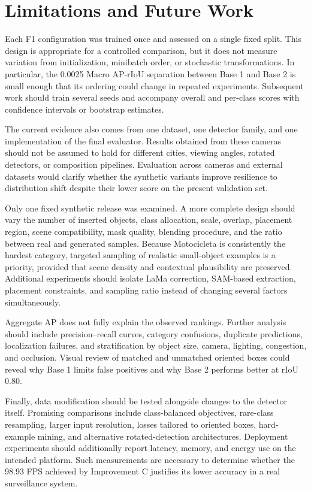 \section{Limitations and Future Work}
\label{sec:limitations_future_work}

Each F1 configuration was trained once and assessed on a single fixed split. This design is appropriate for a controlled comparison, but it does not measure variation from initialization, minibatch order, or stochastic transformations. In particular, the 0.0025 Macro AP-rIoU separation between Base 1 and Base 2 is small enough that its ordering could change in repeated experiments. Subsequent work should train several seeds and accompany overall and per-class scores with confidence intervals or bootstrap estimates.

The current evidence also comes from one dataset, one detector family, and one implementation of the final evaluator. Results obtained from these cameras should not be assumed to hold for different cities, viewing angles, rotated detectors, or composition pipelines. Evaluation across cameras and external datasets would clarify whether the synthetic variants improve resilience to distribution shift despite their lower score on the present validation set.

Only one fixed synthetic release was examined. A more complete design should vary the number of inserted objects, class allocation, scale, overlap, placement region, scene compatibility, mask quality, blending procedure, and the ratio between real and generated samples. Because Motocicleta is consistently the hardest category, targeted sampling of realistic small-object examples is a priority, provided that scene density and contextual plausibility are preserved. Additional experiments should isolate LaMa correction, SAM-based extraction, placement constraints, and sampling ratio instead of changing several factors simultaneously.

Aggregate AP does not fully explain the observed rankings. Further analysis should include precision--recall curves, category confusions, duplicate predictions, localization failures, and stratification by object size, camera, lighting, congestion, and occlusion. Visual review of matched and unmatched oriented boxes could reveal why Base 1 limits false positives and why Base 2 performs better at rIoU 0.80.

Finally, data modification should be tested alongside changes to the detector itself. Promising comparisons include class-balanced objectives, rare-class resampling, larger input resolution, losses tailored to oriented boxes, hard-example mining, and alternative rotated-detection architectures. Deployment experiments should additionally report latency, memory, and energy use on the intended platform. Such measurements are necessary to determine whether the 98.93 FPS achieved by Improvement C justifies its lower accuracy in a real surveillance system.

